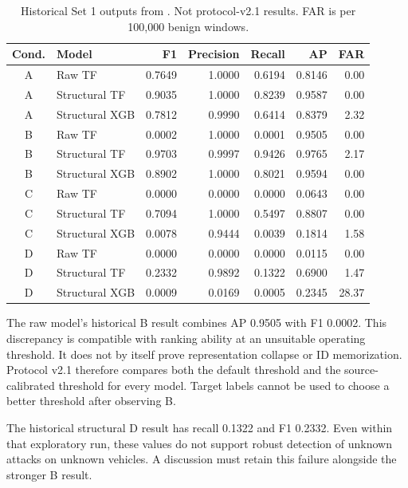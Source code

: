 \documentclass[12pt,a4paper,oneside,openany]{extbook}
\DeclareRobustCommand{\code}[1]{\texttt{\detokenize{#1}}}
\begin{document}
\begin{table}[htbp]\centering\small
\caption{Historical Set 1 outputs from \code{phase3_method_comparison.csv}. Not protocol-v2.1 results. FAR is per 100,000 benign windows.}\label{tab:historical}
\begin{tabular}{clrrrrr}\toprule
Cond. & Model & F1 & Precision & Recall & AP & FAR\\\midrule

A & Raw TF & 0.7649 & 1.0000 & 0.6194 & 0.8146 & 0.00 \\
A & Structural TF & 0.9035 & 1.0000 & 0.8239 & 0.9587 & 0.00 \\
A & Structural XGB & 0.7812 & 0.9990 & 0.6414 & 0.8379 & 2.32 \\
B & Raw TF & 0.0002 & 1.0000 & 0.0001 & 0.9505 & 0.00 \\
B & Structural TF & 0.9703 & 0.9997 & 0.9426 & 0.9765 & 2.17 \\
B & Structural XGB & 0.8902 & 1.0000 & 0.8021 & 0.9594 & 0.00 \\
C & Raw TF & 0.0000 & 0.0000 & 0.0000 & 0.0643 & 0.00 \\
C & Structural TF & 0.7094 & 1.0000 & 0.5497 & 0.8807 & 0.00 \\
C & Structural XGB & 0.0078 & 0.9444 & 0.0039 & 0.1814 & 1.58 \\
D & Raw TF & 0.0000 & 0.0000 & 0.0000 & 0.0115 & 0.00 \\
D & Structural TF & 0.2332 & 0.9892 & 0.1322 & 0.6900 & 1.47 \\
D & Structural XGB & 0.0009 & 0.0169 & 0.0005 & 0.2345 & 28.37 \\
\bottomrule
\end{tabular}
\end{table}

The raw model's historical B result combines AP 0.9505 with F1 0.0002. This discrepancy is compatible with ranking ability at an unsuitable operating threshold. It does not by itself prove representation collapse or ID memorization. Protocol v2.1 therefore compares both the default threshold and the source-calibrated threshold for every model. Target labels cannot be used to choose a better threshold after observing B.

The historical structural D result has recall 0.1322 and F1 0.2332. Even within that exploratory run, these values do not support robust detection of unknown attacks on unknown vehicles. A discussion must retain this failure alongside the stronger B result.
\end{document}
